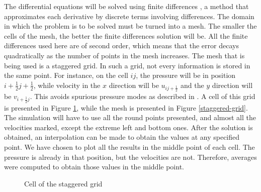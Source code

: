 \documentclass[journal]{IEEEtran}
\begin{document}
The differential equations will be solved using finite differences \cite{zbMATH03010997}, a method that approximates each derivative by discrete terms involving differences. The domain in which the problem is to be solved must be turned into a mesh. The smaller the cells of the mesh, the better the finite differences solution will be. All the finite differences used here are of second order, which means that the error decays quadratically as the number of points in the mesh increases. The mesh that is being used is a staggered grid. In such a grid, not every information is stored in the same point. For instance, on the cell $ij$, the pressure will be in position $i+\frac{1}{2}j+\frac{1}{2}$, while velocity in the $x$ direction will be $u_{ij+\frac{1}{2}}$ and the $y$ direction will be $v_{i+\frac{1}{2}j}$. This avoids spurious pressure modes as described in \cite{hinchLectureNotes}. A cell of this grid is presented in Figure \ref{grid-cell}, while the mesh is presented in Figure \ref{staggered-grid}. The simulation will have to use all the round points presented, and almost all the velocities marked, except the extreme left and bottom ones. After the solution is obtained, an interpolation can be made to obtain the values at any specified point. We have chosen to plot all the results in the middle point of each cell. The pressure is already in that position, but the velocities are not. Therefore, averages were computed to obtain those values in the middle point.

\begin{figure}[!ht]
\centering
{}
\caption{Cell of the staggered grid\label{grid-cell}}
\end{figure}
\end{document}
